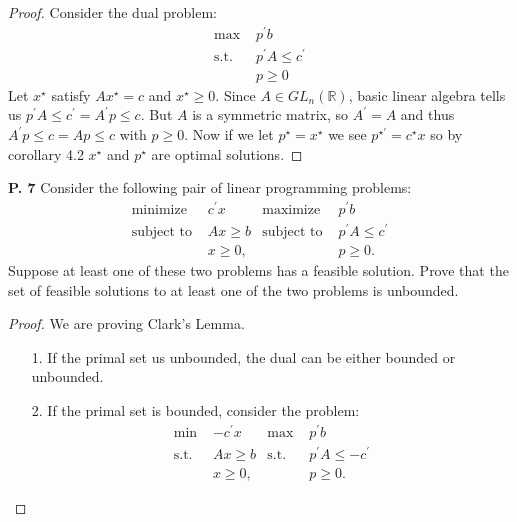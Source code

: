 \documentclass{article}
\begin{document}
\begin{jacklist}
\begin{proof}
        Consider the dual problem:
        \begin{align*}
            \text{max } & p^\prime b \\
            \text{s.t. } & p^\prime A \leq c^\prime \\
                         & p \geq 0
        \end{align*} 
        Let $x^\star$ satisfy $Ax^\star = c$ and $x^\star \geq 0$. Since $A \in GL_n(\mathbb{R})$, basic linear algebra tells us 
        $p^\prime A \leq c^\prime  = A^\prime p \leq c$. But $A$ is a symmetric matrix, so $A^\prime = A$ and thus $A^\prime p \leq c
        = Ap \leq c$ with $p \geq 0$. Now if we let $p^\star = x^\star$ we see $p^{\star\prime} = c^\star x$ so by corollary 
        4.2 $x^\star$ and $p^\star$ are optimal solutions. 
    \end{proof}
\newpage
    \begin{framed} 
    \item [\textbf{P. 7}] Consider the following pair of linear programming problems:
        \begin{align*}
            \text{minimize } & c^{\prime} x & \text{maximize } & p^{\prime} b \\
            \text{subject to } & A x \geq b & \text{subject to } & p^{\prime} A \leq c^{\prime} \\
            & x \geq 0, & & p \geq 0 .
        \end{align*}
        Suppose at least one of these two problems has a feasible solution. Prove that the set of feasible solutions to at least 
        one of the two problems is unbounded.
    \end{framed}
    \begin{proof}
        We are proving Clark's Lemma. \\
        \begin{itemize}
            \item [1.] If the primal set us unbounded, the dual can be either bounded or unbounded. 
            \item [2.] If the primal set is bounded, consider the problem: 
                \begin{align*}
                    \text{min } & -c^\prime x & \text{max } & p^\prime b \\
                    \text{s.t. } & Ax \geq b & \text{s.t.} & p^\prime A \leq -c^\prime \\
                                 &x \geq 0, & & p \geq 0. 
                \end{align*} 

\end{itemize}
\end{proof}
\end{jacklist}
\end{document}
